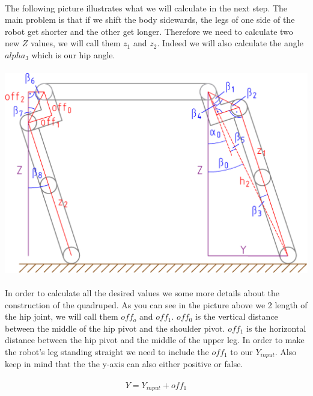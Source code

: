 \documentclass{article}
\begin{document}
    \paragraph{}
    The following picture illustrates what we will calculate in the next step. The main problem is that if we shift the body sidewards, the legs of one side of the robot get shorter and the other get longer. Therefore we need to calculate two new $Z$ values, we will call them $z_1$ and $z_2$. Indeed we will also calculate the angle $alpha_3$ which is our hip angle.

    \paragraph{}
    \includegraphics[scale=0.2]{y-axis}

    \paragraph{}
    In order to calculate all the desired values we some more details about the construction of the quadruped. As you can see in the picture above we 2 length of the hip joint, we will call them $off_o$ and $off_1$. $off_0$ is the vertical distance between the middle of the hip pivot and the shoulder pivot. $off_1$ is the horizontal distance between the hip pivot and the middle of the upper leg. In order to make the robot's leg standing straight we need to include the $off_1$ to our $Y_{input}$. Also keep in mind that the the y-axis can also either positive or false.

    \paragraph{}
    \begin{equation}
        Y = Y_{input} + off_1
    \end{equation}
\end{document}
